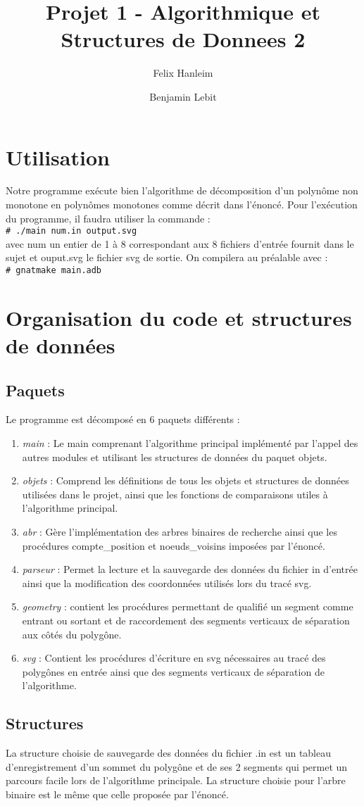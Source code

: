 \documentclass[11pt,english]{article}
\author{
{Felix Hanleim}
\and
{Benjamin Lebit}
}
\title{Projet 1 - Algorithmique et Structures de Donnees 2}
\newcommand{\shellcmd}[1]{\\\indent\indent\texttt{\footnotesize\# #1}\\}
\begin{document}
\maketitle
\section{Utilisation}
Notre programme exécute bien l'algorithme de décomposition d'un polynôme 
non monotone en polynômes monotones comme décrit dans l'énoncé. 
Pour l'exécution du programme, il faudra utiliser la commande :
\shellcmd{./main num.in output.svg}
avec num un entier de 1 à 8 correspondant aux 8 fichiers d'entrée fournit dans 
le sujet et ouput.svg le fichier svg de sortie.
On compilera au préalable avec :
\shellcmd{gnatmake main.adb}


\section{Organisation du code et structures de données}
\subsection{Paquets}
Le programme est décomposé en 6 paquets différents :
\begin{enumerate}
\item \emph{main} : Le main comprenant l'algorithme principal implémenté par 
l'appel des autres modules et utilisant les structures de données du paquet objets.
\item \emph{objets} : Comprend les définitions de tous les objets et structures
 de données utilisées dans le projet, ainsi que les fonctions de comparaisons utiles
 à l'algorithme principal.
\item \emph{abr} : Gère l'implémentation des arbres binaires de recherche ainsi 
que les procédures compte\_position et noeuds\_voisins imposées par l'énoncé.
\item \emph{parseur} : Permet la lecture et la sauvegarde des données du fichier 
in d'entrée ainsi que la modification des coordonnées utilisés lors du tracé svg.
\item \emph{geometry} : contient les procédures permettant de qualifié un segment 
comme entrant ou sortant et de raccordement des segments verticaux de séparation 
aux côtés du polygône. 
\item \emph{svg} : Contient les procédures d'écriture en svg nécessaires au tracé 
des polygônes en entrée ainsi que des segments verticaux de séparation de l'algorithme.
\end{enumerate}
\subsection{Structures}
La structure choisie de sauvegarde des données du fichier .in est un tableau 
d'enregistrement d'un sommet du polygône et de ses 2 segments qui permet un 
parcours facile lors de l'algorithme principale. La structure choisie pour 
l'arbre binaire est le même que celle proposée par l'énoncé.
\end{document}

